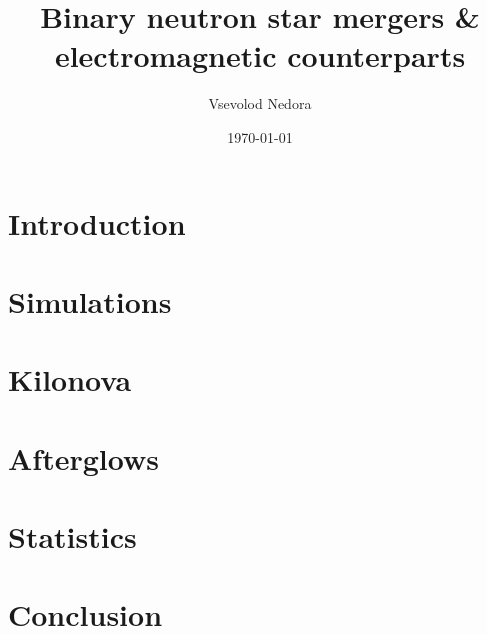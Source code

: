 \documentclass[unknownkeysallowed,aspectratio=169]{beamer} %
\title[BNS mergers \& EM counterparts]{
    Binary neutron star mergers \& 
    electromagnetic counterparts
}
\author[V. Nedora]{Vsevolod Nedora}
\institute[Fridrih Shiller Institute Jena]
\date{\today}
\begin{document}


\begin{frame} %
\titlepage
\end{frame}

\section{Introduction}

\section{Simulations}

%
\section{Kilonova}

\section{Afterglows}

\section{Statistics}

\section{Conclusion}


\appendix



\printbibliography[heading=bibintoc]
%
\end{document}
